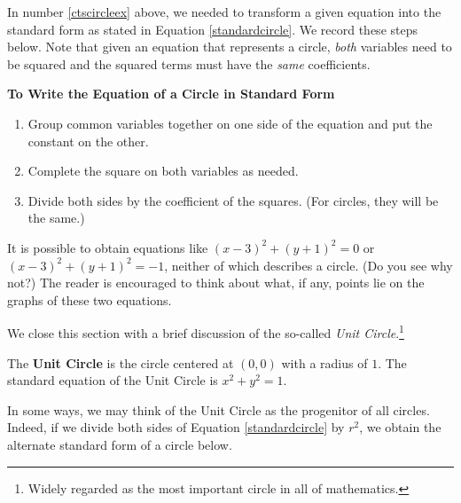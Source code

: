 \documentclass{ximera}
\begin{document}
In number \ref{ctscircleex} above, we needed to transform a given equation into the standard form as stated in Equation \ref{standardcircle}.  We record these steps below.  Note that given an equation that represents a circle, \textit{both} variables need to be squared and the squared terms must have the \textit{same} coefficients.


\centerline{\textbf{To Write the Equation of a Circle in Standard Form}}

\begin{enumerate}

\item  Group common variables together on one side of the equation and put the constant on the other.

\item  Complete the square on both variables as needed.

\item  Divide both sides by the coefficient of the squares. (For circles, they will be the same.)

\end{enumerate}


 

It is possible to obtain equations like $(x-3)^2 + (y+1)^2 = 0$ or $(x-3)^2 + (y+1)^2 = -1$, neither of which describes a circle. (Do you see why not?)  The reader is encouraged to think about what, if any, points lie on the graphs of these two equations.  

 

We close this section with a brief discussion of the so-called  \textit{Unit Circle}.\footnote{Widely regarded as the most important circle in all of mathematics.}

 


\begin{definition}

The \textbf{Unit Circle}  \label{UnitCircle} is the circle centered at $(0,0)$ with a radius of $1$.  The standard equation of the Unit Circle is $x^2 + y^2 = 1.$

\end{definition}


 

In some ways, we may think of the Unit Circle as the progenitor of all circles.  Indeed, if we divide both sides of Equation \ref{standardcircle} by $r^2$, we obtain the alternate standard form of a circle below.  
\end{document}
